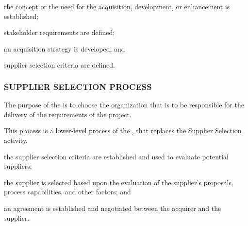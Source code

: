 			\begin{adjustwidth}{2em}{0pt} 

				\begin{compactitem}

					\item the concept or the need for the acquisition, development, or enhancement is established;

					\item stakeholder requirements are defined;

					\item an acquisition strategy is developed; and

					\item supplier selection criteria are defined.

				\end{compactitem}

			\end{adjustwidth}

		\subsubsection{SUPPLIER SELECTION PROCESS\label{llproc:supplier_selection_process}}

			\begin{adjustwidth}{2em}{0pt} 

				The purpose of the  is to choose the organization that is to be responsible for the delivery of the requirements of the project.

				This process is a lower-level process of the , that replaces the Supplier Selection activity.

			\end{adjustwidth}

			\begin{adjustwidth}{2em}{0pt} 

				\begin{compactitem}

					\item the supplier selection criteria are established and used to evaluate potential suppliers;

					\item the supplier is selected based upon the evaluation of the supplier's proposals, process capabilities, and other factors; and

					\item an agreement is established and negotiated between the acquirer and the supplier.

				\end{compactitem}

			\end{adjustwidth}

